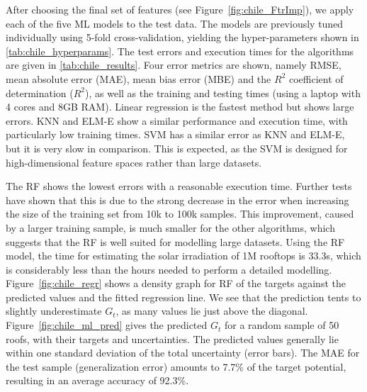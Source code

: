 After choosing the final set of features (see Figure~\ref{fig:chile_FtrImp}), we apply each of the five ML models to the test data. The models are previously tuned individually using 5-fold cross-validation, yielding the hyper-parameters shown in \ref{tab:chile_hyperparams}. The test errors and execution times for the algorithms are given in \ref{tab:chile_results}. Four error metrics are shown, namely RMSE, mean absolute error (MAE), mean bias error (MBE) and the $R^2$ coefficient of determination ($R^2$), as well as the training and testing times (using a laptop with 4 cores and 8GB RAM). Linear regression is the fastest method but shows large errors. KNN and ELM-E show a similar performance and execution time, with particularly low training times. SVM has a similar error as KNN and ELM-E, but it is very slow in comparison. This is expected, as the SVM is designed for high-dimensional feature spaces rather than large datasets. 

The RF shows the lowest errors with a reasonable execution time. Further tests have shown that this is due to the strong decrease in the error when increasing the size of the training set from 10k to 100k samples. This improvement, caused by a larger training sample, is much smaller for the other algorithms, which suggests that the RF is well suited for modelling large datasets. Using the RF model, the time for estimating the solar irradiation of 1M rooftops is 33.3s, which is considerably less than the hours needed to perform a detailed modelling. Figure~\ref{fig:chile_regr} shows a density graph for RF of the targets against the predicted values and the fitted regression line. We see that the prediction tents to slightly underestimate $G_t$, as many values lie just above the diagonal. Figure~\ref{fig:chile_ml_pred} gives the predicted $G_t$ for a random sample of 50 roofs, with their targets and uncertainties. The predicted values generally lie within one standard deviation of the total uncertainty (error bars). The MAE for the test sample (generalization error) amounts to 7.7\% of the target potential, resulting in an average accuracy of 92.3\%. 

